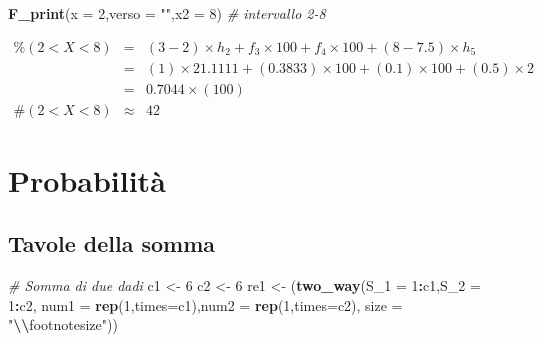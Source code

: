 \documentclass[
  11pt,
]{book}
\newenvironment{Shaded}{\begin{snugshade}}{\end{snugshade}}
\newcommand{\AttributeTok}[1]{\textcolor[rgb]{0.13,0.29,0.53}{#1}}
\newcommand{\CommentTok}[1]{\textcolor[rgb]{0.56,0.35,0.01}{\textit{#1}}}
\newcommand{\DecValTok}[1]{\textcolor[rgb]{0.00,0.00,0.81}{#1}}
\newcommand{\FunctionTok}[1]{\textcolor[rgb]{0.13,0.29,0.53}{\textbf{#1}}}
\newcommand{\NormalTok}[1]{#1}
\newcommand{\OtherTok}[1]{\textcolor[rgb]{0.56,0.35,0.01}{#1}}
\newcommand{\SpecialCharTok}[1]{\textcolor[rgb]{0.81,0.36,0.00}{\textbf{#1}}}
\newcommand{\StringTok}[1]{\textcolor[rgb]{0.31,0.60,0.02}{#1}}
\theoremstyle{mytheoremstyle}
\theoremstyle{mydefstyle}
\begin{document}
\begin{Shaded}
\begin{Highlighting}[]
\FunctionTok{F\_print}\NormalTok{(}\AttributeTok{x =} \DecValTok{2}\NormalTok{,}\AttributeTok{verso =} \StringTok{""}\NormalTok{,}\AttributeTok{x2 =} \DecValTok{8}\NormalTok{) }\CommentTok{\# intervallo 2{-}8}
\end{Highlighting}
\end{Shaded}

\begin{eqnarray*} \%(2<X<8) &=& (3-2)\times h_{2}+ f_{ 3 }\times 100+f_{ 4 }\times 100 + (8-7.5)\times h_{5}  \\ 
 &=& (1)\times 21.1111+ ( 0.3833 )\times 100+( 0.1 )\times 100 + (0.5)\times 2  \\ 
 &=&  0.7044 \times(100)\\
     \#( 2 < X < 8 ) &\approx& 42 
         \end{eqnarray*}

\section{Probabilità}\label{probabilituxe0-1}

\subsection{Tavole della somma}\label{tavole-della-somma}

\begin{Shaded}
\begin{Highlighting}[]
\CommentTok{\# Somma di due dadi}
\NormalTok{c1 }\OtherTok{\textless{}{-}} \DecValTok{6}
\NormalTok{c2 }\OtherTok{\textless{}{-}} \DecValTok{6}
\NormalTok{re1 }\OtherTok{\textless{}{-}}\NormalTok{ (}\FunctionTok{two\_way}\NormalTok{(}\AttributeTok{S\_1 =} \DecValTok{1}\SpecialCharTok{:}\NormalTok{c1,}\AttributeTok{S\_2 =} \DecValTok{1}\SpecialCharTok{:}\NormalTok{c2,}
                \AttributeTok{num1 =} \FunctionTok{rep}\NormalTok{(}\DecValTok{1}\NormalTok{,}\AttributeTok{times=}\NormalTok{c1),}\AttributeTok{num2 =} \FunctionTok{rep}\NormalTok{(}\DecValTok{1}\NormalTok{,}\AttributeTok{times=}\NormalTok{c2),}
                \AttributeTok{size =} \StringTok{"}\SpecialCharTok{\textbackslash{}\textbackslash{}}\StringTok{footnotesize"}\NormalTok{))}
\end{Highlighting}
\end{Shaded}

\footnotesize
\end{document}
